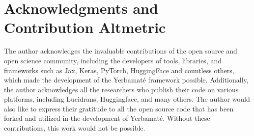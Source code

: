 

\section{Acknowledgments and Contribution Alt\-metric}

The author acknowledges the invaluable contributions of the open source and open science community, including the developers of tools, libraries, and frameworks such as Jax, Keras, PyTorch, HuggingFace and countless others, which made the development of the Yerbamaté framework possible. Additionally, the author acknowledges all the researchers who publish their code on various platforms, including Lucidrans, Huggingface, and many others. The author would also like to express their gratitude to all the open source code that has been forked and utilized in the development of Yerbamaté. Without these contributions, this work would not be possible.



